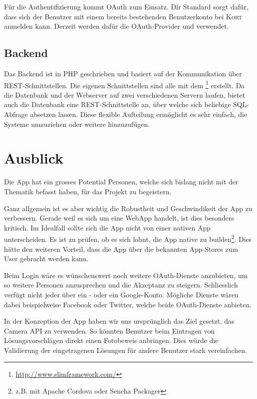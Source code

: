 Für die Authentifizierung kommt \gls{OAuth} zum Einsatz.
Dir Standard sorgt dafür, dass sich der Benutzer mit einem bereits bestehenden Benutzerkonto bei \textsc{Kort} anmelden kann.
Derzeit werden dafür die \gls{OAuth}-Provider  und  verwendet.

\subsection*{Backend}
Das Backend ist in PHP geschrieben und basiert auf der Kommunikation über \gls{REST}-Schnittstellen.
Die eigenen Schnittstellen sind alle mit dem \footnote{\url{http://www.slimframework.com/}} erstellt.
Da die Datenbank und der Webserver auf zwei verschiedenen Servern laufen, bietet auch die Datenbank eine \gls{REST}-Schnittstelle an, über welche sich beliebige SQL-Abfrage absetzen lassen.
Diese flexible Aufteilung ermöglicht es sehr einfach, die Systeme umzuziehen oder weitere hinzuzufügen.

\section*{Ausblick}
Die App hat ein grosses Potential Personen, welche sich bislang nicht mit der Thematik  befasst haben, für das Projekt zu begeistern.

Ganz allgemein ist es aber wichtig die Robustheit und Geschwindikeit der App zu verbessern. 
Gerade weil es sich um eine \gls{WebApp} handelt, ist dies besonders kritisch. 
Im Idealfall sollte sich die App nicht von einer nativen App unterscheiden.
Es ist zu prüfen, ob es sich lohnt, die App native zu builden\footnote{z.B. mit Apache Cordova oder Sencha Packager}.
Dies hätte den weiteren Vorteil, dass die App über die bekannten \glspl{App-Store} zum User gebracht werden kann.

Beim Login wäre es wünschenswert noch weitere \gls{OAuth}-Dienste anzubieten, um so weitere Personen anzusprechen und die Akzeptanz zu steigern.
Schliesslich verfügt nicht jeder über ein - oder ein Google-Konto.
Mögliche Dienste wären dabei beispielweise Facebook oder Twitter, welche beide \gls{OAuth}-Dienste anbieten.

In der Konzeption der App haben wir uns ursprünglich das Ziel gesetzt, das \gls{Camera API} zu verwenden. 
So könnten Benutzer beim Eintragen von Lösungsvorschlägen direkt einen Fotobeweis anbringen. 
Dies würde die Validierung der eingetragenen Lösungen für andere Benutzer stark vereinfachen.

